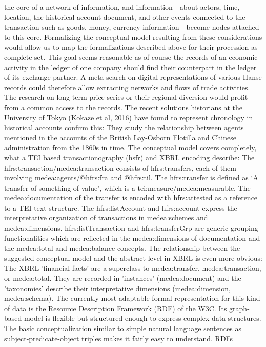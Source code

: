 \documentclass[12pt,a4paper]{article}
\begin{document}
the core of a network of information, and information—about actors, time, location, the historical account document, and other events connected to the transaction such as goods,
money, currency information—become nodes attached to this core.
Formalizing the conceptual model resulting from these considerations would allow us to map the
formalizations described above for their procession as complete set. This goal seems reasonable
as of course the records of an economic activity in the ledger of one company should find their
counterpart in the ledger of its exchange partner. A meta search on digital representations of
various Hanse records could therefore allow extracting networks and flows of trade activities.
The research on long term price series or their regional diversion would profit from a common
access to the records. The recent solutions historians at the University of Tokyo (Kokaze et al,
2016) have found to represent chronology in historical accounts confirm this: They study the
relationship between agents mentioned in the accounts of the British Lay-Osborn Flotilla and
Chinese administration from the 1860s in time.
The conceptual model covers completely, what a TEI based transactionography (hsfr) and XBRL
encoding describe: The hfrs:transaction/medea:transaction consists of hfrs:transfers, each of
them involving medea:agents/@hfrs:fra and @hfrs:til. The hfrs:transfer is defined as ‘A transfer
of something of value’, which is a tei:measure/medea:measurable. The medea:documentation of
the transfer is encoded with hfrs:attested as a reference to a TEI text structure. The
hfrs:listAccount and hfrs:account express the interpretative organization of transactions in
medea:schemes and medea:dimensions. hfrs:listTransaction and hfrs:transferGrp are generic
grouping functionalities which are reflected in the medea:dimensions of documentation and the
medea:total and medea:balance concepts. The relationship between the suggested conceptual
model and the abstract level in XBRL is even more obvious: The XBRL 'financial facts' are a
superclass to medea:transfer, medea:transaction, or medea:total. They are recorded in 'instances'
(medea:document) and the 'taxonomies' describe their interpretative dimensions
(medea:dimension, medea:schema).
The currently most adaptable formal representation for this kind of data is the Resource
Description Framework (RDF) of the W3C. Its graph-based model is flexible but structured
enough to express complex data structures. The basic conceptualization similar to simple natural
language sentences as subject-predicate-object triples makes it fairly easy to understand. RDFs
\end{document}
